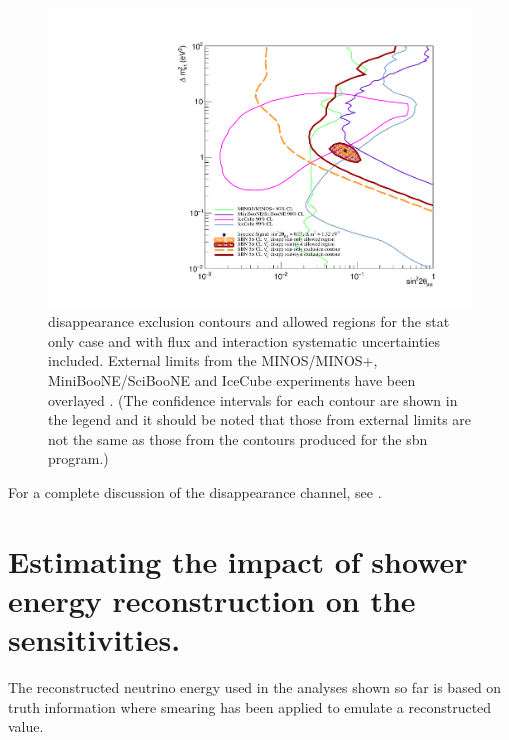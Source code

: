 \begin{figure}[h!]
    \centering
    \includegraphics[width = \largefigwidth]{figures-chap6/overlays/valor_overlays_numu_disapp.pdf}
    \caption[\numu disappearance contours with external limits.]{\numu disappearance exclusion contours and allowed regions for the stat only case and with flux and interaction systematic uncertainties included. External limits from the MINOS/MINOS+, MiniBooNE/SciBooNE and IceCube experiments have been overlayed \cite{MINOS_numu_disapp_contour}\cite{MiniBooNE/SciBooNE_numu_disapp_contour}\cite{IceCube_numu_disapp_contour}. (The confidence intervals for each contour are shown in the legend and it should be noted that those from external limits are not the same as those from the contours produced for the \gls{sbn} program.)}
    \label{fig:numu_disapp_global_sensitivity}
\end{figure}

For a complete discussion of the \numu disappearance channel, see \cite{Rhiannon's_thesis}.

\clearpage

\section{\texorpdfstring{Estimating the impact of shower energy reconstruction on the \nue sensitivities.}{Estimating the impact of shower energy reconstruction on the nue sensitivities.}}

The reconstructed neutrino energy used in the analyses shown so far is based on truth information where smearing has been applied to emulate a reconstructed value. 

